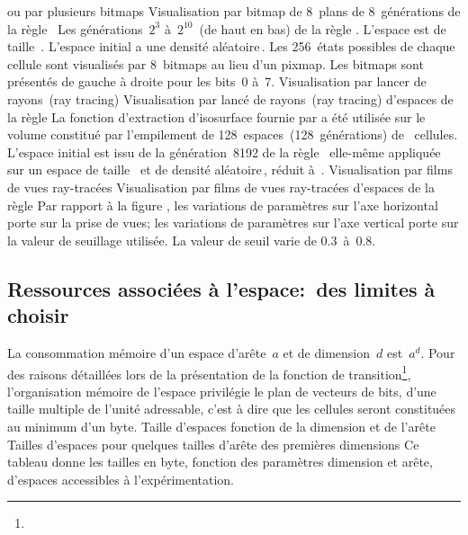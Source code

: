 %
{ou par plusieurs bitmaps}%
{Visualisation par bitmap de 8~plans de 8~g\'en\'erations de la
  r\`egle~}%
{Les g\'en\'erations~$2^{3}$ \`a~$2^{10}$~(de haut en bas) de la r\`egle
  . %
  L'espace est de taille~. %
  L'espace initial a une densit\'e al\'eatoire\,\Sundemi. %
  Les 256~\'etats possibles de chaque cellule sont visualis\'es par
  8~bitmaps au lieu d'un pixmap. %
  Les bitmaps sont pr\'esent\'es de gauche \`a droite pour les bits~0 \`a~7.}
%
{Visualisation par lancer de rayons~(ray tracing)}
{Visualisation par lanc\'e de rayons~(ray tracing) d'espaces de la
  r\`egle }%
{La fonction d'extraction d'isosurface fournie par  a
  \'et\'e utilis\'ee sur le volume constitu\'e par l'empilement de
  128~espaces~(128~g\'en\'erations) de~ cellules. %
  L'espace initial est issu de la g\'en\'eration~8192 de la
  r\`egle~ elle-m\^eme appliqu\'ee sur un espace de
  taille~ et de densit\'e al\'eatoire\,\Sundemi, r\'eduit
  \`a~.}
%
{Visualisation par films de vues ray-trac\'ees}%
{Visualisation par films de vues ray-trac\'ees d'espaces de la
  r\`egle }%
{Par rapport \`a la figure , les variations de
  param\`etres sur l'axe horizontal porte sur la prise de vues; %
  les variations de param\`etres sur l'axe vertical porte sur la valeur
  de seuillage utilis\'ee. %
  La valeur de seuil varie de 0.3~\`a~0.8.}
\clearpage

\subsection{Ressources associ\'ees \`a l'espace:~des limites \`a choisir}

La consommation m\'emoire d'un espace d'ar\^ete~$a$ et de dimension~$d$
est~$a^{d}$. %
Pour des raisons d\'etaill\'ees lors de la pr\'esentation de
la fonction de tran\-si\-tion\footnote{%
 }, %
l'organisation m\'emoire de l'espace privil\'egie le plan de vecteurs de
bits, d'une taille multiple de l'unit\'e adressable, c'est \`a dire que
les cellules seront constitu\'ees au minimum d'un byte.
{Taille d'espaces fonction de la dimension et
  de l'ar\^ete}%
{Tailles d'espaces pour quelques tailles d'ar\^ete des premi\`eres dimensions}%
{Ce tableau donne les tailles en byte, fonction des param\`etres dimension
  et ar\^ete, d'espaces accessibles \`a l'exp\'erimentation.}

